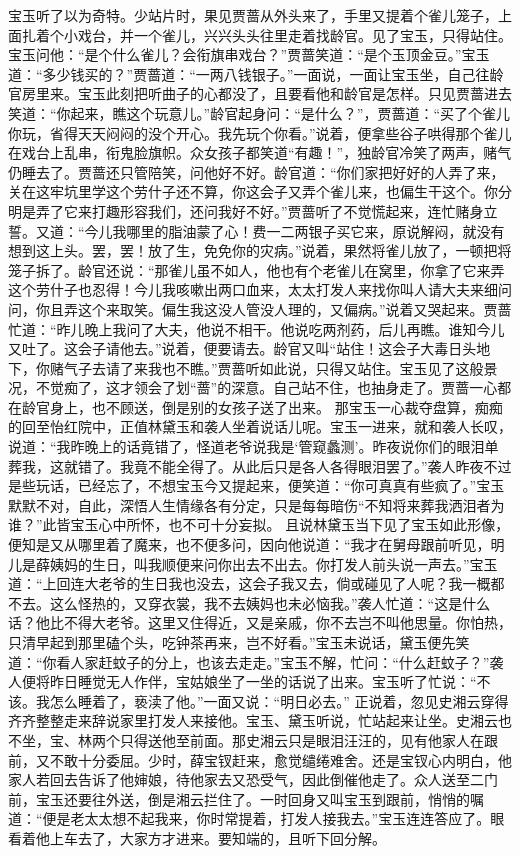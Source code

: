 \documentclass[12pt,oneside]{book}
\begin{document}
宝玉听了以为奇特。少站片时，果见贾蔷从外头来了，手里又提着个雀儿笼子，上面扎着个小戏台，并一个雀儿，兴兴头头往里走着找龄官。见了宝玉，只得站住。宝玉问他：“是个什么雀儿？会衔旗串戏台？”贾蔷笑道：“是个玉顶金豆。”宝玉道：“多少钱买的？”贾蔷道：“一两八钱银子。”一面说，一面让宝玉坐，自己往龄官房里来。宝玉此刻把听曲子的心都没了，且要看他和龄官是怎样。只见贾蔷进去笑道：“你起来，瞧这个玩意儿。”龄官起身问：“是什么？”，贾蔷道：“买了个雀儿你玩，省得天天闷闷的没个开心。我先玩个你看。”说着，便拿些谷子哄得那个雀儿在戏台上乱串，衔鬼脸旗帜。众女孩子都笑道“有趣！”，独龄官冷笑了两声，赌气仍睡去了。贾蔷还只管陪笑，问他好不好。龄官道：“你们家把好好的人弄了来，关在这牢坑里学这个劳什子还不算，你这会子又弄个雀儿来，也偏生干这个。你分明是弄了它来打趣形容我们，还问我好不好。”贾蔷听了不觉慌起来，连忙赌身立誓。又道：“今儿我哪里的脂油蒙了心！费一二两银子买它来，原说解闷，就没有想到这上头。罢，罢！放了生，免免你的灾病。”说着，果然将雀儿放了，一顿把将笼子拆了。龄官还说：“那雀儿虽不如人，他也有个老雀儿在窝里，你拿了它来弄这个劳什子也忍得！今儿我咳嗽出两口血来，太太打发人来找你叫人请大夫来细问问，你且弄这个来取笑。偏生我这没人管没人理的，又偏病。”说着又哭起来。贾蔷忙道：“昨儿晚上我问了大夫，他说不相干。他说吃两剂药，后儿再瞧。谁知今儿又吐了。这会子请他去。”说着，便要请去。龄官又叫“站住！这会子大毒日头地下，你赌气子去请了来我也不瞧。”贾蔷听如此说，只得又站住。宝玉见了这般景况，不觉痴了，这才领会了划“蔷”的深意。自己站不住，也抽身走了。贾蔷一心都在龄官身上，也不顾送，倒是别的女孩子送了出来。
那宝玉一心裁夺盘算，痴痴的回至怡红院中，正值林黛玉和袭人坐着说话儿呢。宝玉一进来，就和袭人长叹，说道：“我昨晚上的话竟错了，怪道老爷说我是‘管窥蠡测’。昨夜说你们的眼泪单葬我，这就错了。我竟不能全得了。从此后只是各人各得眼泪罢了。”袭人昨夜不过是些玩话，已经忘了，不想宝玉今又提起来，便笑道：“你可真真有些疯了。”宝玉默默不对，自此，深悟人生情缘各有分定，只是每每暗伤“不知将来葬我洒泪者为谁？”此皆宝玉心中所怀，也不可十分妄拟。
且说林黛玉当下见了宝玉如此形像，便知是又从哪里着了魔来，也不便多问，因向他说道：“我才在舅母跟前听见，明儿是薛姨妈的生日，叫我顺便来问你出去不出去。你打发人前头说一声去。”宝玉道：“上回连大老爷的生日我也没去，这会子我又去，倘或碰见了人呢？我一概都不去。这么怪热的，又穿衣裳，我不去姨妈也未必恼我。”袭人忙道：“这是什么话？他比不得大老爷。这里又住得近，又是亲戚，你不去岂不叫他思量。你怕热，只清早起到那里磕个头，吃钟茶再来，岂不好看。”宝玉未说话，黛玉便先笑道：“你看人家赶蚊子的分上，也该去走走。”宝玉不解，忙问：“什么赶蚊子？”袭人便将昨日睡觉无人作伴，宝姑娘坐了一坐的话说了出来。宝玉听了忙说：“不该。我怎么睡着了，亵渎了他。”一面又说：“明日必去。”
正说着，忽见史湘云穿得齐齐整整走来辞说家里打发人来接他。宝玉、黛玉听说，忙站起来让坐。史湘云也不坐，宝、林两个只得送他至前面。那史湘云只是眼泪汪汪的，见有他家人在跟前，又不敢十分委屈。少时，薛宝钗赶来，愈觉缱绻难舍。还是宝钗心内明白，他家人若回去告诉了他婶娘，待他家去又恐受气，因此倒催他走了。众人送至二门前，宝玉还要往外送，倒是湘云拦住了。一时回身又叫宝玉到跟前，悄悄的嘱道：“便是老太太想不起我来，你时常提着，打发人接我去。”宝玉连连答应了。眼看着他上车去了，大家方才进来。要知端的，且听下回分解。
\end{document}
